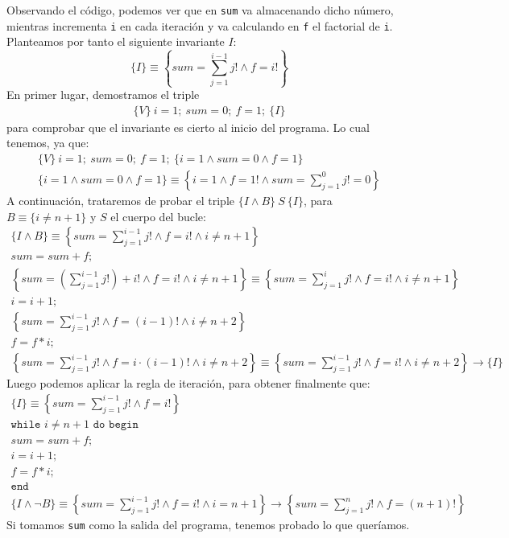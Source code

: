 \begin{ejercicio}
    Observando el código, podemos ver que en \verb|sum| va almacenando dicho número, mientras incrementa \verb|i| en cada iteración y va calculando en \verb|f| el factorial de \verb|i|. Planteamos por tanto el siguiente invariante $I$:
    \begin{equation*}
        \{I\} \equiv \left\{ sum = \sum_{j=1}^{i-1} j! \land f = i! \right\}
    \end{equation*}
    En primer lugar, demostramos el triple
    \begin{gather*}
        \{V\}\ i = 1;\ sum = 0;\ f=1;\ \{I\}
    \end{gather*}
    para comprobar que el invariante es cierto al inicio del programa. Lo cual tenemos, ya que:
    \begin{gather*}
        \{V\}\ i=1;\ sum=0;\ f=1;\ \{i=1 \land sum = 0 \land f = 1\} \\
        \{i=1 \land sum = 0 \land f = 1\}\equiv \left\{i=1 \land f=1! \land sum = \sum_{j=1}^0 j! = 0\right\}
    \end{gather*}
    A continuación, trataremos de probar el triple $\{I \land B\}\ S\ \{I\}$, para $B \equiv \{i \neq n+1\}$ y $S$ el cuerpo del bucle:
    \begin{gather*}
        \{I \land B\} \equiv \left\{ sum = \sum_{j=1}^{i-1} j! \land f = i! \land i\neq n+1\right\} \\
        sum = sum + f; \\
        \left\{ sum = \left(\sum_{j=1}^{i-1} j!\right)+i! \land f = i! \land i\neq n+1\right\} \equiv \left\{ sum = \sum_{j=1}^{i} j! \land f = i! \land i\neq n+1\right\} \\
        i = i + 1; \\
        \left\{ sum = \sum_{j=1}^{i-1} j! \land f = (i-1)! \land i\neq n+2\right\} \\
        f = f * i; \\
        \left\{ sum = \sum_{j=1}^{i-1} j! \land f = i\cdot (i-1)! \land i\neq n+2\right\} \equiv \left\{ sum = \sum_{j=1}^{i-1} j! \land f = i! \land i\neq n+2\right\} \rightarrow \{I\}
    \end{gather*}
    Luego podemos aplicar la regla de iteración, para obtener finalmente que:
    \begin{gather*}
        \{I\} \equiv \left\{ sum = \sum_{j=1}^{i-1} j! \land f = i!\right\} \\
        \texttt{while\ } i \neq n+1 \texttt{\ do\ begin} \\
        sum = sum + f; \\
        i = i + 1;\\
        f = f * i;\\ 
        \texttt{end} \\
        \{I \land \lnot B\} \equiv \left\{ sum = \sum_{j=1}^{i-1} j! \land f = i! \land i = n+1\right\} \rightarrow  \left\{sum = \sum_{j=1}^n j! \land f = (n+1)! \right\}
    \end{gather*}
    Si tomamos \verb|sum| como la salida del programa, tenemos probado lo que queríamos.
\end{ejercicio}

